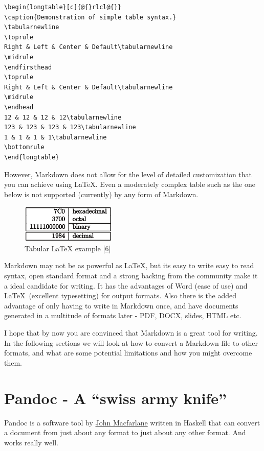 \documentclass[journal,10pt,final]{IEEEtran}
\begin{document}
\begin{verbatim}
\begin{longtable}[c]{@{}rlcl@{}}
\caption{Demonstration of simple table syntax.}
\tabularnewline
\toprule
Right & Left & Center & Default\tabularnewline
\midrule
\endfirsthead
\toprule
Right & Left & Center & Default\tabularnewline
\midrule
\endhead
12 & 12 & 12 & 12\tabularnewline
123 & 123 & 123 & 123\tabularnewline
1 & 1 & 1 & 1\tabularnewline
\bottomrule
\end{longtable}
\end{verbatim}

However, Markdown does not allow for the level of detailed customization
that you can achieve using \LaTeX. Even a moderately complex table such
as the one below is not supported (currently) by any form of Markdown.

\begin{figure}[htbp]
\centering
\includegraphics{../images/table.png}
\caption{Tabular LaTeX example
{[}\protect\hyperlink{ref-ux5fwikibooks}{6}{]}}
\end{figure}

Markdown may not be as powerful as \LaTeX, but its easy to write easy to
read syntax, open standard format and a strong backing from the
community make it a ideal candidate for writing. It has the advantages
of Word (ease of use) and \LaTeX~(excellent typesetting) for output
formats. Also there is the added advantage of only having to write in
Markdown once, and have documents generated in a multitude of formats
later - PDF, DOCX, slides, HTML etc.

I hope that by now you are convinced that Markdown is a great tool for
writing. In the following sections we will look at how to convert a
Markdown file to other formats, and what are some potential limitations
and how you might overcome them.

\section{\texorpdfstring{Pandoc - A ``swiss army
knife''}{Pandoc - A swiss army knife}}\label{pandoc---a-swiss-army-knife}

Pandoc is a software tool by \href{https://johnmacfarlane.net/}{John
Macfarlane} written in Haskell that can convert a document from just
about any format to just about any other format. And works really well.
\end{document}
